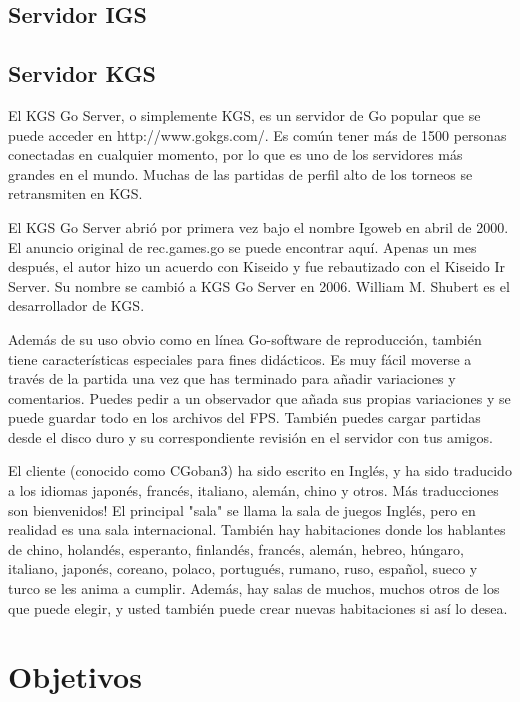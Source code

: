 \documentclass[12pt,a4paper]{report}
\begin{document}
\section{Servidor IGS}

\section{Servidor KGS}
El KGS Go Server, o simplemente KGS, es un servidor de Go popular que se puede acceder en http://www.gokgs.com/. Es común tener más de 1500 personas conectadas en cualquier momento, por lo que es uno de los servidores más grandes en el mundo. Muchas de las partidas de perfil alto de los torneos se retransmiten en KGS.

El KGS Go Server abrió por primera vez bajo el nombre Igoweb en abril de 2000. El anuncio original de rec.games.go se puede encontrar aquí. Apenas un mes después, el autor hizo un acuerdo con Kiseido y fue rebautizado con el Kiseido Ir Server. Su nombre se cambió a KGS Go Server en 2006. William M. Shubert es el desarrollador de KGS.

Además de su uso obvio como en línea Go-software de reproducción, también tiene características especiales para fines didácticos. Es muy fácil moverse a través de la partida una vez que has terminado para añadir variaciones y comentarios. Puedes pedir a un observador que añada sus propias variaciones y se puede guardar todo en los archivos del FPS. También puedes cargar partidas desde el disco duro y su correspondiente revisión en el servidor con tus amigos.

El cliente (conocido como CGoban3) ha sido escrito en Inglés, y ha sido traducido a los idiomas japonés, francés, italiano, alemán, chino y otros. Más traducciones son bienvenidos! El principal "sala" se llama la sala de juegos Inglés, pero en realidad es una sala internacional. También hay habitaciones donde los hablantes de chino, holandés, esperanto, finlandés, francés, alemán, hebreo, húngaro, italiano, japonés, coreano, polaco, portugués, rumano, ruso, español, sueco y turco se les anima a cumplir. Además, hay salas de muchos, muchos otros de los que puede elegir, y usted también puede crear nuevas habitaciones si así lo desea.

\chapter{Objetivos}
\end{document}
